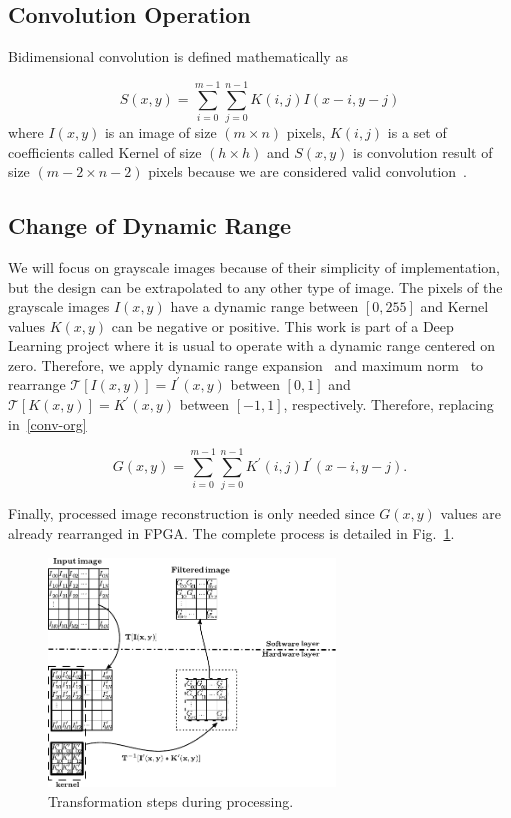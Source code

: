 \documentclass[conference,compsoc]{IEEEtran}
\begin{document}
\subsection{Convolution Operation}

Bidimensional convolution is defined mathematically as

\begin{equation}\label{conv-org}
  S(x,y) = \sum_{i=0}^{m-1} \sum_{j=0}^{n-1}K(i,j)I(x-i,y-j)
\end{equation}
where $I(x,y)$ is an image of size $(m \times n)$ pixels, $K(i,j)$ is a set of
coefficients called Kernel of size $(h \times h)$ and $S(x,y)$ is convolution
result of size $(m-2 \times n-2)$ pixels because we are considered valid
convolution~\cite{validconv}. 

\subsection{Change of Dynamic Range}

We will focus on grayscale images because of their simplicity of implementation,
but the design can be extrapolated to any other type of image. The pixels of the
grayscale images $I(x,y)$ have a dynamic range between $[0,255]$ and Kernel
values $K(x,y)$ can be negative or positive. This work is part of a Deep
Learning project where it is usual to operate with a dynamic range centered on
zero. Therefore, we apply dynamic range expansion~\cite{dinamic_rango} and
maximum norm~\cite{max_norm} to rearrange $\mathcal{T}[I(x,y)]=I^\prime(x,y)$
between $[0,1]$ and $\mathcal{T}[K(x,y)]=K^\prime(x,y)$ between $[-1,1]$,
respectively. Therefore, replacing in~\eqref{conv-org}

\begin{equation}\label{conv-org1}
  G(x,y) = \sum_{i=0}^{m-1} \sum_{j=0}^{n-1}K^\prime(i,j)I^\prime(x-i,y-j).
\end{equation}

Finally, processed image reconstruction is only needed since $G(x,y)$ values are already
rearranged in FPGA.
The complete process is detailed in Fig.~\ref{transformation}.

\begin{figure}[!t]
\centering
\includegraphics[width=3in]{filter}
\caption{Transformation steps during processing.}
\label{transformation}
\end{figure}
\end{document}
